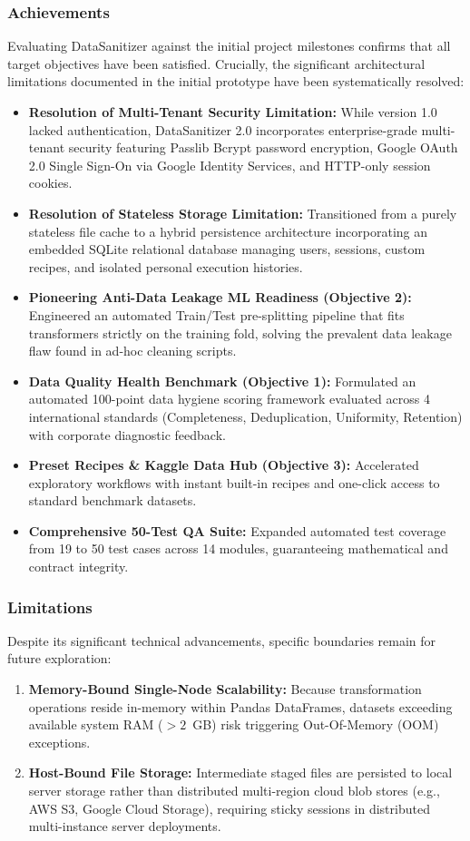 \subsubsection{Achievements}
Evaluating DataSanitizer against the initial project milestones confirms that all target objectives have been satisfied. Crucially, the significant architectural limitations documented in the initial prototype have been systematically resolved:
\begin{itemize}
  \item \textbf{Resolution of Multi-Tenant Security Limitation:} While version 1.0 lacked authentication, DataSanitizer 2.0 incorporates enterprise-grade multi-tenant security featuring Passlib Bcrypt password encryption, Google OAuth 2.0 Single Sign-On via Google Identity Services, and HTTP-only session cookies.
  \item \textbf{Resolution of Stateless Storage Limitation:} Transitioned from a purely stateless file cache to a hybrid persistence architecture incorporating an embedded SQLite relational database managing users, sessions, custom recipes, and isolated personal execution histories.
  \item \textbf{Pioneering Anti-Data Leakage ML Readiness (Objective 2):} Engineered an automated Train/Test pre-splitting pipeline that fits transformers strictly on the training fold, solving the prevalent data leakage flaw found in ad-hoc cleaning scripts.
  \item \textbf{Data Quality Health Benchmark (Objective 1):} Formulated an automated 100-point data hygiene scoring framework evaluated across 4 international standards (Completeness, Deduplication, Uniformity, Retention) with corporate diagnostic feedback.
  \item \textbf{Preset Recipes \& Kaggle Data Hub (Objective 3):} Accelerated exploratory workflows with instant built-in recipes and one-click access to standard benchmark datasets.
  \item \textbf{Comprehensive 50-Test QA Suite:} Expanded automated test coverage from 19 to 50 test cases across 14 modules, guaranteeing mathematical and contract integrity.
\end{itemize}

\subsubsection{Limitations}
Despite its significant technical advancements, specific boundaries remain for future exploration:
\begin{enumerate}
  \item \textbf{Memory-Bound Single-Node Scalability:} Because transformation operations reside in-memory within Pandas DataFrames, datasets exceeding available system RAM ($> 2$~GB) risk triggering Out-Of-Memory (OOM) exceptions.
  \item \textbf{Host-Bound File Storage:} Intermediate staged files are persisted to local server storage rather than distributed multi-region cloud blob stores (e.g., AWS S3, Google Cloud Storage), requiring sticky sessions in distributed multi-instance server deployments.
\end{enumerate}

